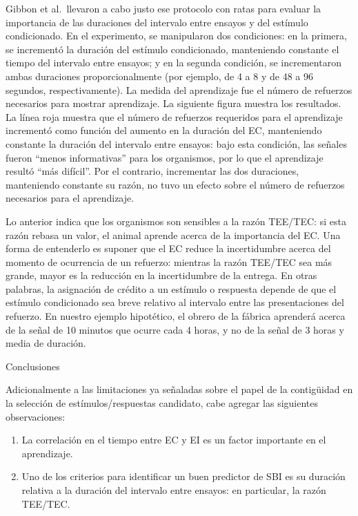 \documentclass[
  a4paper,
  DIV=11,
  numbers=noendperiod]{scrreprt}
\begin{document}
Gibbon et al.~llevaron a cabo justo ese protocolo con ratas para evaluar
la importancia de las duraciones del intervalo entre ensayos y del
estímulo condicionado. En el experimento, se manipularon dos
condiciones: en la primera, se incrementó la duración del estímulo
condicionado, manteniendo constante el tiempo del intervalo entre
ensayos; y en la segunda condición, se incrementaron ambas duraciones
proporcionalmente (por ejemplo, de 4 a 8 y de 48 a 96 segundos,
respectivamente). La medida del aprendizaje fue el número de refuerzos
necesarios para mostrar aprendizaje. La siguiente figura muestra los
resultados. La línea roja muestra que el número de refuerzos requeridos
para el aprendizaje incrementó como función del aumento en la duración
del EC, manteniendo constante la duración del intervalo entre ensayos:
bajo esta condición, las señales fueron ``menos informativas'' para los
organismos, por lo que el aprendizaje resultó ``más difícil''. Por el
contrario, incrementar las dos duraciones, manteniendo constante su
razón, no tuvo un efecto sobre el número de refuerzos necesarios para el
aprendizaje.

Lo anterior indica que los organismos son sensibles a la razón TEE/TEC:
si esta razón rebasa un valor, el animal aprende acerca de la
importancia del EC. Una forma de entenderlo es suponer que el EC reduce
la incertidumbre acerca del momento de ocurrencia de un refuerzo:
mientras la razón TEE/TEC sea más grande, mayor es la reducción en la
incertidumbre de la entrega. En otras palabras, la asignación de crédito
a un estímulo o respuesta depende de que el estímulo condicionado sea
breve relativo al intervalo entre las presentaciones del refuerzo. En
nuestro ejemplo hipotético, el obrero de la fábrica aprenderá acerca de
la señal de 10 minutos que ocurre cada 4 horas, y no de la señal de 3
horas y media de duración.

Conclusiones

Adicionalmente a las limitaciones ya señaladas sobre el papel de la
contigüidad en la selección de estímulos/respuestas candidato, cabe
agregar las siguientes observaciones:

\begin{enumerate}
\def\labelenumi{\arabic{enumi}.}
\item
  La correlación en el tiempo entre EC y EI es un factor importante en
  el aprendizaje.
\item
  Uno de los criterios para identificar un buen predictor de SBI es su
  duración relativa a la duración del intervalo entre ensayos: en
  particular, la razón TEE/TEC.
\end{enumerate}
\end{document}
